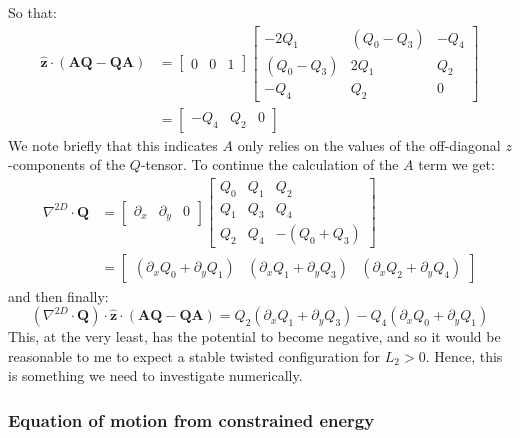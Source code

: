 \documentclass[reqno]{article}
\newcommand{\Q}{\mathbf{Q}}
\newcommand{\A}{\mathbf{A}}
\newcommand{\z}{\mathbf{\hat{z}}}
\begin{document}
So that:
\begin{equation}
\begin{split}
    \z \cdot (\A \Q - \Q \A)
    &=
    \begin{bmatrix}
        0 &0 &1
    \end{bmatrix}
    \begin{bmatrix}
        -2 Q_1 &(Q_0 - Q_3) &-Q_4 \\
        (Q_0 - Q_3) &2 Q_1 &Q_2 \\
        -Q_4 &Q_2 &0
    \end{bmatrix} \\
    &=
    \begin{bmatrix}
        -Q_4 &Q_2 &0
    \end{bmatrix}
\end{split}
\end{equation}
We note briefly that this indicates $A$ only relies on the values of the off-diagonal $z$-components of the $Q$-tensor.
To continue the calculation of the $A$ term we get:
\begin{equation}
\begin{split}
    \nabla^{2D} \cdot \Q
    &=
    \begin{bmatrix}
        \partial_x &\partial_y &0
    \end{bmatrix}
    \begin{bmatrix}
        Q_0 &Q_1 &Q_2 \\
        Q_1 &Q_3 &Q_4 \\
        Q_2 &Q_4 &-(Q_0 + Q_3)
    \end{bmatrix} \\
    &=
    \begin{bmatrix}
        (\partial_x Q_0 + \partial_y Q_1) &(\partial_x Q_1 + \partial_y Q_3) &(\partial_x Q_2 + \partial_y Q_4)
    \end{bmatrix}
\end{split}
\end{equation}
and then finally:
\begin{equation}
    \left( \nabla^{2D} \cdot \Q\right) \cdot \z \cdot \left( \A \Q - \Q \A \right)
    =
    Q_2 \left( \partial_x Q_1 + \partial_y Q_3 \right)
    - Q_4 \left( \partial_x Q_0 + \partial_y Q_1 \right)
\end{equation}
This, at the very least, has the potential to become negative, and so it would be reasonable to me to expect a stable twisted configuration for $L_2 > 0$.
Hence, this is something we need to investigate numerically.

\subsubsection{Equation of motion from constrained energy}
\end{document}
